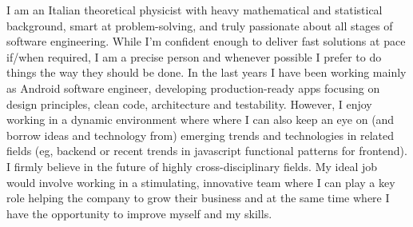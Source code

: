 
\begin{cvparagraph}
I am an Italian theoretical physicist with heavy mathematical and statistical 
background, smart at problem-solving, and truly passionate about all stages of software engineering. 
While 
I'm confident enough to
deliver 
fast solutions at pace
if/when
required, 
I am a precise person and whenever possible I prefer to do things the way they
should be done.
In the last years I have been working mainly as Android software engineer,  developing production-ready apps 
	focusing on design principles, clean code, architecture and testability.
 However, I enjoy  working in a dynamic
environment where 
 where I can also keep an eye on (and borrow ideas and technology from) emerging trends and technologies in related
fields (eg, backend or recent trends in javascript functional patterns for frontend). 
 I firmly
believe in the future of highly cross-disciplinary fields.
My ideal job would involve working in a stimulating, innovative team where I
can play a key role helping the company to grow their business and at the same time
where I have the opportunity to improve myself and my skills.
\end{cvparagraph}
